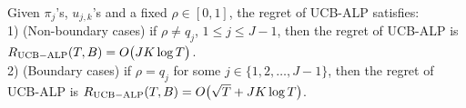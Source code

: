\newpage
\begin{theorem}\label{thm:regret_ucb_alp_new}
Given $\pi_j$'s, $u_{j,k}$'s and a fixed $\rho \in [0,1]$, the regret of UCB-ALP satisfies:\\
1) (Non-boundary cases) if $\rho \neq q_j$, $1 \leq j \leq J-1$, then the regret of UCB-ALP is $R_{\rm{UCB-ALP}}(T, B) = O\big(JK\log T\big)$.\\
2) (Boundary cases) if $\rho = q_j$ for some $j \in \{ 1,2, \ldots, J-1\}$, then the regret of UCB-ALP is $R_{\rm{UCB-ALP}}(T, B) = O\big(\sqrt{T} + JK\log T \big)$.
\end{theorem}


